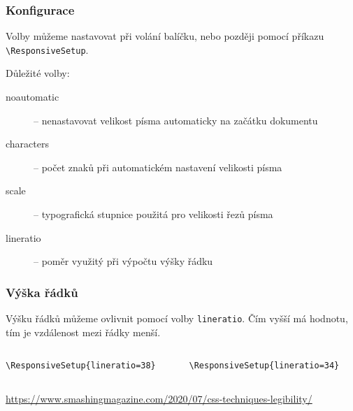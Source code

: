 \begin{frame}[fragile]
  \frametitle{Konfigurace}
  Volby můžeme nastavovat při volání balíčku, nebo později pomocí příkazu \verb|\ResponsiveSetup|.

  Důležité volby:

  \begin{description}
    \item[noautomatic] -- nenastavovat velikost písma automaticky na začátku dokumentu
    \item[characters] -- počet znaků při automatickém nastavení velikosti písma
    \item[scale] --  typografická stupnice použitá pro velikosti řezů písma
    \item[lineratio] -- poměr využitý při výpočtu výšky řádku
  \end{description}

\end{frame}

\begin{frame}[fragile]
  \frametitle{Výška řádků}
  Výšku řádků můžeme ovlivnit pomocí volby \texttt{lineratio}. 
Čím vyšší má hodnotu, tím je vzdálenost mezi řádky menší.

\begin{columns}
  \begin{column}{0.5\textwidth}
\begin{verbatim}
\ResponsiveSetup{lineratio=38}
\end{verbatim}
\end{column}
  \begin{column}{0.5\textwidth}
\begin{verbatim}
\ResponsiveSetup{lineratio=34}
\end{verbatim}
\end{column}
\end{columns}
\url{https://www.smashingmagazine.com/2020/07/css-techniques-legibility/}

\end{frame}

